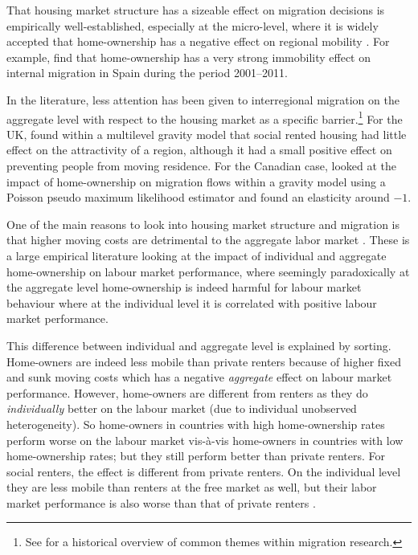 \documentclass[fleqn,10pt]{SelfArx} %
\begin{document}
    	That housing market structure has a sizeable effect on migration
    	decisions is empirically well-established, especially at the
    	micro-level, where it is widely accepted that home-ownership has a
    	negative effect on regional mobility \citep{dietz2003social,
    		dohmen2005housing}. For example, \citet{palomares2018understanding}
    	find that home-ownership has a very strong immobility effect on internal
    	migration in Spain during the period 2001--2011.
    	
    	In the literature, less attention has been given to interregional
    	migration on the aggregate level with respect to the housing market as a
    	specific barrier.\footnote{See \citet{cushing2004crossing} for a
    		historical overview of common themes within migration research.} For
    	the UK, \citet{congdon2010random} found within a multilevel gravity
    	model that social rented housing had little effect on the attractivity
    	of a region, although it had a small positive effect on preventing
    	people from moving residence. For the Canadian case,
    	\citet{amirault2016drags} looked at the impact of home-ownership on
    	migration flows within a gravity model using a Poisson pseudo maximum
    	likelihood estimator and found an elasticity around $-1$.
    	           
        One of the main reasons to look into housing market structure and migration is that   
        higher moving costs are detrimental to the aggregate labor market
        \citep{oswald1996conjecture, oswald1999housing}. These is a large
        empirical literature \citep[see, e.g., ][]{munch2006homeowners,
          munch2008home, de2013european} looking at the impact of individual and
        aggregate home-ownership on labour market performance, where seemingly
        paradoxically at the aggregate level home-ownership is indeed harmful
        for labour market behaviour where at the individual level it is
        correlated with positive labour market performance.
        
        This difference between individual and aggregate level is explained by
        sorting. Home-owners are indeed less mobile than private renters because
        of higher fixed and sunk moving costs which has a negative
        \emph{aggregate} effect on labour market performance. However,
        home-owners are different from renters as they do \emph{individually}
        better on the labour market (due to individual unobserved
        heterogeneity). So home-owners in countries with high home-ownership
        rates perform worse on the labour market vis-\`a-vis home-owners in
        countries with low home-ownership rates; but they still perform better
        than private renters. For social renters, the effect is different from
        private renters. On the individual level they are less mobile than
        renters at the free market as well, but their labor market performance
        is also worse than that of private renters \citep{hughes1981council,
          de2009homeownership}.
        
\end{document}
